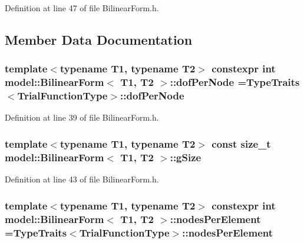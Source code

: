 Definition at line 47 of file Bilinear\+Form.\+h.



\subsection{Member Data Documentation}
\hypertarget{structmodel_1_1_bilinear_form_a7bcebed645c29aaac2af31f6cd473f7c}{}
\subsubsection[{dof\+Per\+Node}]{\setlength{\rightskip}{0pt plus 5cm}template$<$typename T1, typename T2$>$ constexpr int {\bf model\+::\+Bilinear\+Form}$<$ T1, T2 $>$\+::dof\+Per\+Node ={\bf Type\+Traits}$<${\bf Trial\+Function\+Type}$>$\+::dof\+Per\+Node\hspace{0.3cm}{\ttfamily [static]}}\label{structmodel_1_1_bilinear_form_a7bcebed645c29aaac2af31f6cd473f7c}


Definition at line 39 of file Bilinear\+Form.\+h.

\hypertarget{structmodel_1_1_bilinear_form_aa8655c3e338a766139318d3b408620c9}{}
\subsubsection[{g\+Size}]{\setlength{\rightskip}{0pt plus 5cm}template$<$typename T1, typename T2$>$ const size\+\_\+t {\bf model\+::\+Bilinear\+Form}$<$ T1, T2 $>$\+::g\+Size}\label{structmodel_1_1_bilinear_form_aa8655c3e338a766139318d3b408620c9}


Definition at line 43 of file Bilinear\+Form.\+h.

\hypertarget{structmodel_1_1_bilinear_form_aee5498daed34f6d94709b6593b1ca695}{}
\subsubsection[{nodes\+Per\+Element}]{\setlength{\rightskip}{0pt plus 5cm}template$<$typename T1, typename T2$>$ constexpr int {\bf model\+::\+Bilinear\+Form}$<$ T1, T2 $>$\+::nodes\+Per\+Element ={\bf Type\+Traits}$<${\bf Trial\+Function\+Type}$>$\+::nodes\+Per\+Element\hspace{0.3cm}{\ttfamily [static]}}\label{structmodel_1_1_bilinear_form_aee5498daed34f6d94709b6593b1ca695}


